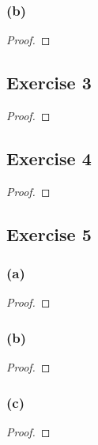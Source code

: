 \documentclass[14pt]{extarticle}
\begin{document}
\subsubsection{(b)}

\begin{proof}

\end{proof}

\subsection{Exercise 3}

\begin{proof}

\end{proof}

\subsection{Exercise 4}

\begin{proof}

\end{proof}

\subsection{Exercise 5}

\subsubsection{(a)}

\begin{proof}

\end{proof}

\subsubsection{(b)}

\begin{proof}

\end{proof}

\subsubsection{(c)}

\begin{proof}

\end{proof}
\end{document}
